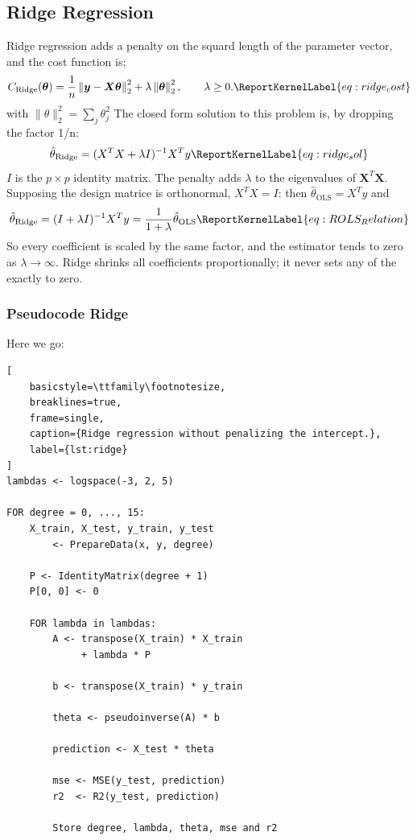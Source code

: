 \documentclass[aps,rmp,reprint,amsmath,amssymb,longbibliography]{revtex4-1}
\let\label\ReportKernelLabel
\begin{document}
\subsection{Ridge Regression}
Ridge regression adds a penalty on the squard length of the parameter vector,
and the cost function is;
\begin{equation}
C_{\mathrm{Ridge}}(\bm{\theta})
= \frac{1}{n}
  \left\|\bm{y}-\bm{X}\bm{\theta}\right\|_2^2
  + \lambda\left\|\bm{\theta}\right\|_2^2,
\qquad \lambda \geq 0.
\label{eq:ridge_cost}
\end{equation}
with $\lVert\theta\rVert_2^2 = \sum_{j}\theta_j^2$
The closed form solution to this problem is,
by dropping the factor 1/n:
\begin{equation}
  \hat{\theta}_{\mathrm{Ridge}} =
  (X^{T}X + \lambda I)^{-1}X^{T}y
\label{eq:ridge_sol}
\end{equation}
$I$ is the $p\times p$ identity matrix. The penalty adds $\lambda$ to the eigenvalues
of $\bm{X}^{T}\bm{X}$. \cite[p.~87]{LectureNotes}
Supposing the design matrice is orthonormal, $X^{T}X=I$: then $\hat{\theta}_{\mathrm{OLS}}=X^{T}y$ and
\begin{equation}
  \hat{\theta}_{\mathrm{Ridge}}=
  (I + \lambda I)^{-1}X^{T}y =
  \frac{1}{1+\lambda}\hat{\theta}_{\mathrm{OLS}}
\label{eq:ROLS_Relation}
\end{equation}
So every coefficient is scaled by the same factor, and the estimator
tends to zero as $\lambda \to \infty$. Ridge shrinks all coefficients proportionally;
it never sets any of the exactly to zero.

\subsubsection{Pseudocode Ridge}
Here we go:
\begin{lstlisting}[
    basicstyle=\ttfamily\footnotesize,
    breaklines=true,
    frame=single,
    caption={Ridge regression without penalizing the intercept.},
    label={lst:ridge}
]
lambdas <- logspace(-3, 2, 5)

FOR degree = 0, ..., 15:
    X_train, X_test, y_train, y_test
        <- PrepareData(x, y, degree)

    P <- IdentityMatrix(degree + 1)
    P[0, 0] <- 0

    FOR lambda in lambdas:
        A <- transpose(X_train) * X_train
             + lambda * P

        b <- transpose(X_train) * y_train

        theta <- pseudoinverse(A) * b

        prediction <- X_test * theta

        mse <- MSE(y_test, prediction)
        r2  <- R2(y_test, prediction)

        Store degree, lambda, theta, mse and r2
\end{lstlisting}
\end{document}
